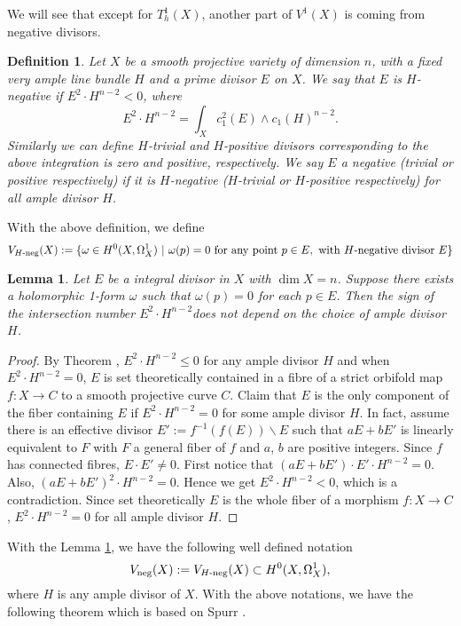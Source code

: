 \documentclass[a4paper,12pt,reqno]{amsart}
\theoremstyle{plain}
\newtheorem{definition}[theorem]{Definition}
\newtheorem{lemma}[theorem]{Lemma}
\theoremstyle{remark}
\begin{document}
We will see that except for $T_h^1(X)$, another part of $V^1(X)$ is coming from negative divisors.
\begin{definition}
Let $X$ be a smooth projective variety of dimension $n$, with a fixed very ample line bundle $H$ and a prime divisor $E$ on $X$. We say that $E$ is $H$-negative if $E^2\cdot H^{n-2}<0$, where $$E^2\cdot H^{n-2}=\int_X c_1^2(E)\wedge c_1(H)^{n-2}.$$ Similarly we can define $H$-trivial and $H$-positive divisors corresponding to the above integration is zero and positive, respectively. We say $E$ a negative (trivial or positive respectively) if it is $H$-negative ($H$-trivial or $H$-positive respectively) for all ample divisor $H$.
\end{definition}  
With the above definition, we define $$V_{H\textnormal{-neg}}(X):=\{\omega\in H^0(X, \Omega_X^1)\ |\ \omega(p)=0\  \textnormal{for any point}\ p\in E, \ \textnormal{with $H$-negative divisor}\  E\}$$  

\begin{lemma}\label{lem:welldef}
Let $E$ be a integral divisor in $X$ with $\dim X=n$. Suppose there exists a holomorphic 1-form $\omega$ such that $\omega(p)=0$ for each $p\in E$. Then the sign of the intersection number $E^2\cdot H^{n-2}$does not depend on the choice of ample divisor $H$.
\end{lemma}

\begin{proof}
By Theorem \cite[Theorem 2]{Sp88}, $E^2\cdot H^{n-2}\leq 0$ for any ample divisor $H$ and when $E^2\cdot H^{n-2}=0$, $E$ is set theoretically contained in a fibre of a strict orbifold map $f: X\to C$ to a smooth projective curve $C$.  Claim that $E$ is the only component of the fiber containing $E$ if $E^2\cdot H^{n-2}=0$ for some ample divisor $H$. In fact, assume there is an effective divisor $E':=f^{-1}(f(E))\backslash E$ such that $aE+bE'$ is linearly equivalent to $F$ with $F$ a general fiber of $f$ and $a$, $b$ are positive integers. Since $f$ has connected fibres, $E\cdot E'\not=0$.  First notice that $(aE+bE')\cdot E'\cdot H^{n-2}=0$. Also, $(aE+bE')^2\cdot H^{n-2}=0$. Hence we get $E^2\cdot H^{n-2}<0$, which is a contradiction. Since set theoretically $E$ is the whole fiber of a morphism $f: X\to C$, $E^2\cdot H^{n-2}=0$ for all ample divisor $H$. 
\end{proof}


With the Lemma \ref{lem:welldef}, we have the following well defined notation$$V_{\textnormal{neg}}(X):=V_{H\textnormal{-neg}}(X)\subset H^0(X, \Omega_X^1),$$ where $H$ is any ample divisor of $X$. With the above notations, we have the following theorem which is based on Spurr \cite[Theorem 2]{Sp88}.
\end{document}
